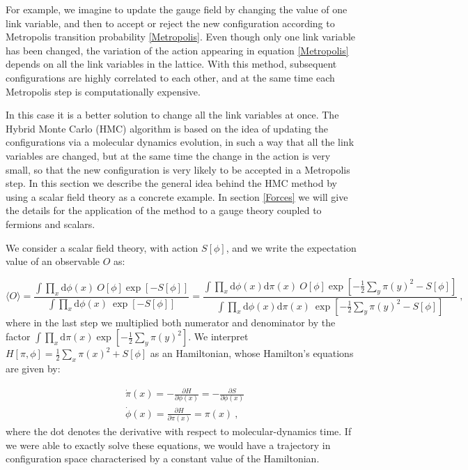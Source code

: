 For example, we imagine to update the gauge field by changing the value of one link variable, and then to accept or reject the new configuration according to Metropolis transition probability \ref{Metropolis}. Even though only one link variable has been changed, the variation of the action appearing in equation \ref{Metropolis} depends on all the link variables in the lattice. With this method, subsequent configurations are highly correlated to each other, and at the same time each Metropolis step is computationally expensive.

In this case it is a better solution to change all the link variables at once. The Hybrid Monte Carlo (HMC) algorithm is based on the idea of updating the configurations via a molecular dynamics evolution, in such a way that all the link variables are changed, but at the same time the change in the action is very small, so that the new configuration is very likely to be accepted in a Metropolis step.
In this section we describe the general idea behind the HMC method by using a scalar field theory as a concrete example. In section \ref{Forces} we will give the details for the application of the method to a gauge theory coupled to fermions and scalars.

We consider a scalar field theory, with action $S[\phi]$, and we write the expectation value of an observable $O$ as:

\begin{equation}
\langle O \rangle = \frac{\int \prod_{x} \mathrm{d} \phi(x) \: O[\phi] \exp[-S[\phi]]}{\int \prod_{x} \mathrm{d} \phi(x) \: \exp[-S[\phi]]} = \frac{\int \prod_{x} \mathrm{d} \phi(x) \mathrm{d} \pi(x) \: O[\phi] \exp[ - \frac{1}{2} \sum_y \pi(y)^2 -S[\phi]]}{\int \prod_{x}  \mathrm{d} \phi(x) \mathrm{d} \pi(x) \: \exp[ - \frac{1}{2} \sum_y \pi(y)^2 -S[\phi]]} \: ,
\label{O_HMC}
\end{equation}
%
where in the last step we multiplied both numerator and denominator by the factor $\int \prod_x \mathrm{d} \pi(x) \exp[ - \frac{1}{2} \sum_y \pi(y)^2]$. We interpret $H[\pi,\phi] =  \frac{1}{2} \sum_x \pi(x)^2 + S[\phi]$ as an Hamiltonian, whose Hamilton's equations are given by:

\begin{equation}
\begin{split}
& \dot \pi(x) = - \frac{\partial H}{\partial \phi(x)} = - \frac{\partial S}{\partial \phi(x)}\\
& \dot \phi(x) = \frac{\partial H}{\partial \pi(x)} = \pi(x) \: ,
\label{Hamilton_eq} 
\end{split}
\end{equation}
%
where the dot denotes the derivative with respect to molecular-dynamics time. If we were able to exactly solve these equations, we would have a trajectory in configuration space characterised by a constant value of the Hamiltonian.

